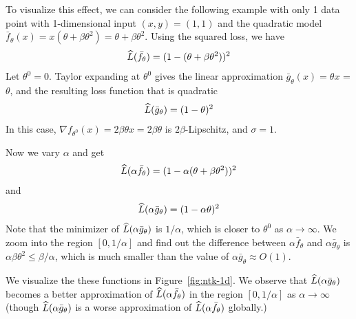 \begin{enumerate}
\begin{remark}
    To visualize this effect, we can consider the following example with only 1 data point with 1-dimensional input $(x,y) = (1,1)$ and the quadratic model $\bar{f}_\theta(x) = x(\theta + \beta \theta^2) = \theta + \beta \theta^2$. Using the squared loss, we have 
    \begin{align}
    \widehat{L}(\bar{f}_\theta) = (1- (\theta + \beta \theta^2))^2 
    \end{align}
    Let $\theta^0 = 0$. Taylor expanding at $\theta^0$ gives the linear approximation $\bar{g}_\theta(x) = \theta x$ = $\theta$, and the resulting loss function that is quadratic 
    \begin{align}
    \widehat{L}(\bar{g}_\theta) = (1- \theta)^2 
    \end{align}
	In this case,  $\nabla f_{\theta^0}(x) = 2\beta \theta x = 2\beta \theta$ is $2\beta$-Lipschitz, and $ \sigma = 1$. 
	
	Now we vary $\alpha$ and get 
    \begin{align}
\widehat{L}(\alpha \bar{f}_\theta) = (1- \alpha(\theta + \beta \theta^2))^2 
\end{align}	
and 
\begin{align}
\widehat{L}(\alpha\bar{g}_\theta) = (1- \alpha\theta)^2 
\end{align}
Note that the minimizer of $	\widehat{L}(\alpha\bar{g}_\theta) $ is $1/\alpha$, which is closer to $\theta^0$ as $\alpha\rightarrow \infty$. We zoom into the region $[0, 1/\alpha]$ and find out the difference between $\alpha \bar{f}_\theta$ and $\alpha \bar{g}_\theta$ is $\alpha \beta\theta^2 \le  \beta/\alpha$, which is much smaller than the value of $\alpha \bar{g}_\theta \approx O(1)$. 

We visualize the these functions in Figure~\ref{fig:ntk-1d}. We observe that $\widehat{L}(\alpha\bar{g}_\theta) $ becomes a better approximation of $\widehat{L}(\alpha\bar{f}_\theta)$ in the region $[0,1/\alpha]$ as $\alpha \rightarrow \infty$ (though $\widehat{L}(\alpha\bar{g}_\theta)$ is a worse approximation of $\widehat{L}(\alpha\bar{f}_\theta)$ globally.)



\end{remark}
\end{enumerate}
